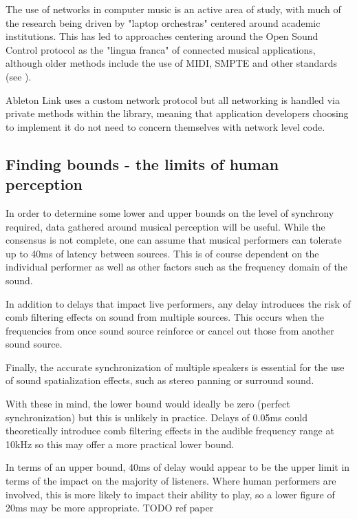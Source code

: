 \documentclass[11pt]{article} %
\theoremstyle{plain}
\theoremstyle{definition}
\begin{document}
The use of networks in computer music is an active area of study, with much of
the research being driven by "laptop orchestras"\cite{trueman2007laptop}
centered around academic institutions. This has led to approaches centering
around the Open Sound Control
protocol\cite{wright2005open}\cite{madgwick2015simple}\cite{narveson2013landini}
as the "lingua franca" of connected musical applications, although older
methods include the use of MIDI, SMPTE and other standards (see \cite{goltz2018ableton}).

Ableton Link uses a custom network protocol but all networking is handled via
private methods within the library, meaning that application developers
choosing to implement it do not need to concern themselves with network level code.

\subsection{Finding bounds - the limits of human perception}

In order to determine some lower and upper bounds on the level of synchrony
required, data gathered around musical perception will be useful. While the
consensus is not complete\cite{greeff2016influence}, one can assume that
musical performers can tolerate up to 40ms of latency between sources. This is
of course dependent on the individual performer as well as other factors such
as the frequency domain of the sound.

In addition to delays that impact live performers, any delay introduces the
risk of comb filtering effects on sound from multiple sources. This occurs when
the frequencies from once sound source reinforce or cancel out those from
another sound source.

Finally, the accurate synchronization of multiple speakers is essential for the
use of sound spatialization effects, such as stereo panning or surround sound.

With these in mind, the lower bound would ideally be zero (perfect
synchronization) but this is unlikely in practice. Delays of 0.05ms could
theoretically introduce comb filtering effects in the audible frequency range
at 10kHz\cite{lester2007effects} so this may offer a more practical lower bound.

In terms of an upper bound, 40ms of delay would appear to be the upper limit in
terms of the impact on the majority of listeners. Where human performers are
involved, this is more likely to impact their ability to play, so a lower
figure of 20ms may be more appropriate. TODO ref paper
\end{document}
